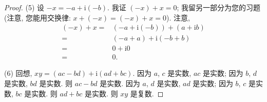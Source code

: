 \documentclass[../libro.tex]{subfiles}
\begin{document}
\begin{proof}
    (5)
    设 \(-x = -a + \mathrm{i} (-b)\).
    我证 \((-x) + x = 0\);
    我留另一部分为您的习题
    (注意, 您能用交换律:
    \(x + (-x) = (-x) + x = 0\)).
    注意,
    \begin{align*}
        (-x) + x
        = {} &
        (-a + \mathrm{i} (-b)) + (a + \mathrm{i} b)
        \\
        = {} &
        (-a + a) + \mathrm{i} (-b + b)
        \\
        = {} &
        0 + \mathrm{i} 0
        \\
        = {} &
        0.
    \end{align*}

    (6)
    回想,
    \(x y = (a c - b d) + \mathrm{i} (a d + b c)\).
    因为 \(a\), \(c\) 是实数,
    \(a c\) 是实数;
    因为 \(b\), \(d\) 是实数,
    \(b d\) 是实数.
    则 \(a c - b d\) 是实数.
    因为 \(a\), \(d\) 是实数,
    \(a d\) 是实数;
    因为 \(b\), \(c\) 是实数,
    \(b c\) 是实数.
    则 \(a d + b c\) 是实数.
    则 \(x y\) 是复数.


\end{proof}
\end{document}
